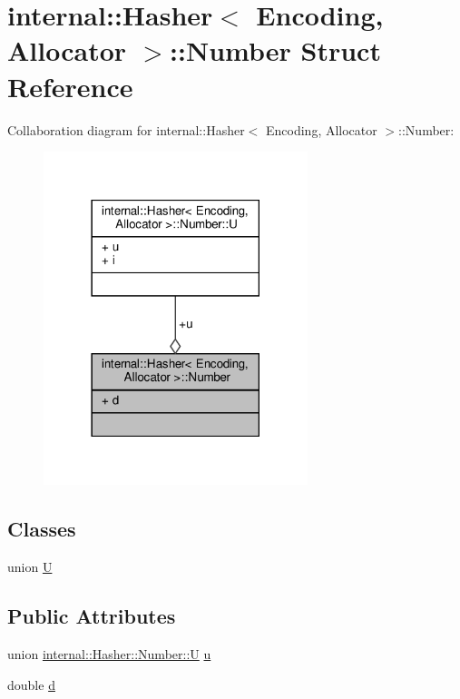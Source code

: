 \hypertarget{structinternal_1_1Hasher_1_1Number}{}\section{internal\+:\+:Hasher$<$ Encoding, Allocator $>$\+:\+:Number Struct Reference}
\label{structinternal_1_1Hasher_1_1Number}


Collaboration diagram for internal\+:\+:Hasher$<$ Encoding, Allocator $>$\+:\+:Number\+:
\nopagebreak
\begin{figure}[H]
\begin{center}
\leavevmode
\includegraphics[width=218pt]{structinternal_1_1Hasher_1_1Number__coll__graph}
\end{center}
\end{figure}
\subsection*{Classes}
\begin{DoxyCompactItemize}
\item 
union \hyperlink{unioninternal_1_1Hasher_1_1Number_1_1U}{U}
\end{DoxyCompactItemize}
\subsection*{Public Attributes}
\begin{DoxyCompactItemize}
\item 
union \hyperlink{unioninternal_1_1Hasher_1_1Number_1_1U}{internal\+::\+Hasher\+::\+Number\+::U} \hyperlink{structinternal_1_1Hasher_1_1Number_a71c1a3256604ddd4316e2cea72b8308f}{u}
\item 
double \hyperlink{structinternal_1_1Hasher_1_1Number_a2ccd7098c4c22f893351670f2b09176d}{d}
\end{DoxyCompactItemize}



